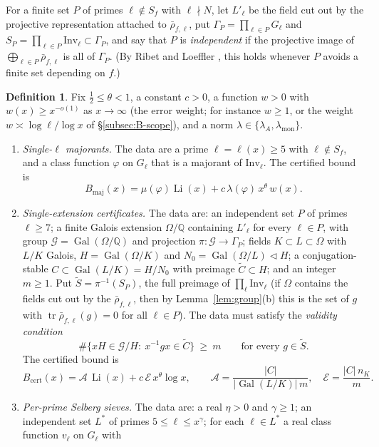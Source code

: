 \documentclass[11pt]{amsart}
\theoremstyle{definition}
\newtheorem{definition}[theorem]{Definition}
\theoremstyle{remark}
\newcommand{\Q}{\mathbb{Q}}
\DeclareMathOperator{\Gal}{Gal}
\DeclareMathOperator{\Li}{Li}
\DeclareMathOperator{\tr}{tr}
\newcommand{\Inv}{\mathrm{Inv}}
\newcommand{\cA}{\mathcal{A}}      %
\newcommand{\cE}{\mathcal{E}}      %
\newcommand{\cG}{\mathcal{G}}      %
\begin{document}
For a finite set $P$ of primes $\ell\notin S_f$ with $\ell\nmid N$, let $L'_\ell$ be the field cut out by the
projective representation attached to $\bar\rho_{f,\ell}$, put $\Gamma_P=\prod_{\ell\in P}G_\ell$ and
$S_P=\prod_{\ell\in P}\Inv_\ell\subset\Gamma_P$, and say that $P$ is \emph{independent} if the projective image of
$\bigoplus_{\ell\in P}\bar\rho_{f,\ell}$ is all of $\Gamma_P$. (By Ribet \cite{Rib85} and Loeffler \cite{Loe17}, this
holds whenever $P$ avoids a finite set depending on $f$.)

\begin{definition}\label{def:classes}
Fix $\frac12\le\theta<1$, a constant $c>0$, a function $w>0$ with $w(x)\ge x^{-o(1)}$ as $x\to\infty$ (the error
weight; for instance $w\ge1$, or the weight $w\asymp\log\ell/\log x$ of \S\ref{subsec:B-scope}), and a norm
$\lambda\in\{\lambda_A,\lambda_{\mathrm{mon}}\}$.
\begin{enumerate}[label=(\alph*),leftmargin=*]
\item \emph{Single-$\ell$ majorants.} The data are a prime $\ell=\ell(x)\ge5$ with $\ell\notin S_f$, and a class
  function $\varphi$ on $G_\ell$ that is a majorant of $\Inv_\ell$. The certified bound is
  \[
    B_{\mathrm{maj}}(x)=\mu(\varphi)\Li(x)+c\,\lambda(\varphi)\,x^\theta\,w(x).
  \]
\item \emph{Single-extension certificates.} The data are: an independent set $P$ of primes $\ell\ge7$; a finite
  Galois extension $\Omega/\Q$ containing $L'_\ell$ for every $\ell\in P$, with group $\cG=\Gal(\Omega/\Q)$ and
  projection $\pi:\cG\to\Gamma_P$; fields $K\subset L\subset\Omega$ with $L/K$ Galois, $H=\Gal(\Omega/K)$ and
  $N_0=\Gal(\Omega/L)\lhd H$; a conjugation-stable $C\subset\Gal(L/K)=H/N_0$ with preimage $\widetilde C\subset H$; and
  an integer $m\ge1$. Put $\widetilde S=\pi^{-1}(S_P)$, the full preimage of $\prod_\ell\Inv_\ell$ (if $\Omega$
  contains the fields cut out by the $\bar\rho_{f,\ell}$, then by Lemma~\ref{lem:group}(b) this is the set of $g$ with
  $\tr\bar\rho_{f,\ell}(g)=0$ for all $\ell\in P$). The data must satisfy the \emph{validity condition}
  \[
    \#\{xH\in\cG/H:\ x^{-1}gx\in\widetilde C\}\ \ge\ m\qquad\text{for every }g\in\widetilde S.
  \]
  The certified bound is
  \[
    B_{\mathrm{cert}}(x)=\cA\,\Li(x)+c\,\cE\,x^\theta\log x,\qquad
    \cA=\frac{|C|}{|\Gal(L/K)|\,m},\quad \cE=\frac{|C|\,n_K}{m}.
  \]
\item \emph{Per-prime Selberg sieves.} The data are: a real $\eta>0$ and $\gamma\ge1$; an independent set $L^*$ of
  primes $5\le\ell\le x^\gamma$; for each $\ell\in L^*$ a real class function $v_\ell$ on $G_\ell$ with

\end{enumerate}
\end{definition}
\end{document}
